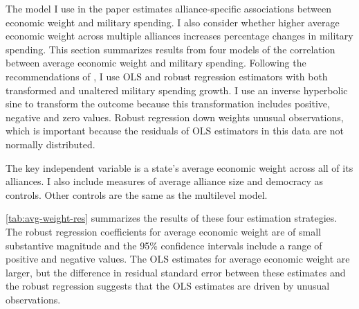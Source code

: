 \documentclass[12pt]{article}
\begin{document}
The model I use in the paper estimates alliance-specific associations between economic weight and military spending. 
I also consider whether higher average economic weight across multiple alliances increases percentage changes in military spending. 
This section summarizes results from four models of the correlation between average economic weight and military spending. 
Following the recommendations of \citet{RaineyBaissa2020}, I use OLS and robust regression estimators with both transformed and unaltered military spending growth.  
I use an inverse hyperbolic sine to transform the outcome because this transformation includes positive, negative and zero values. 
Robust regression down weights unusual observations, which is important because the residuals of OLS estimators in this data are not normally distributed. 


The key independent variable is a state's average economic weight across all of its alliances. 
I also include measures of average alliance size and democracy \citep{DigiuseppePoast2016} as controls. 
Other controls are the same as the multilevel model.  


\autoref{tab:avg-weight-res} summarizes the results of these four estimation strategies. 
The robust regression coefficients for average economic weight are of small substantive magnitude and the 95\% confidence intervals include a range of positive and negative values. 
The OLS estimates for average economic weight are larger, but the difference in residual standard error between these estimates and the robust regression suggests that the OLS estimates are driven by unusual observations. 
\end{document}

